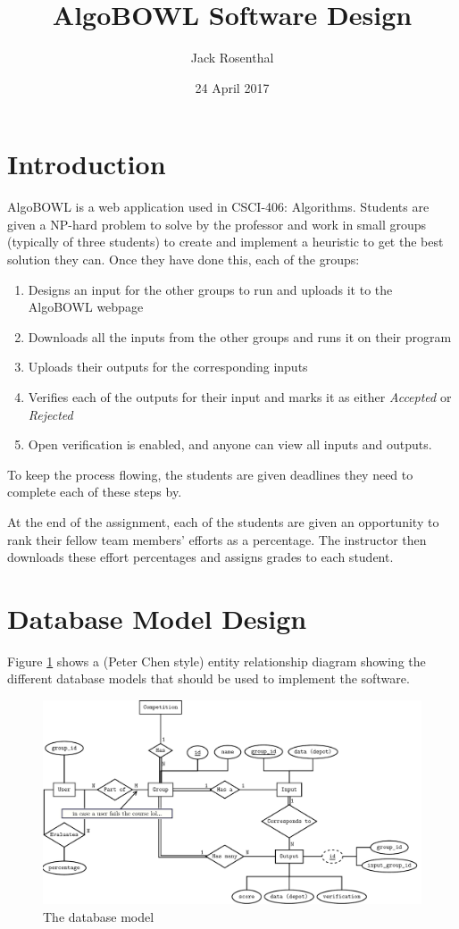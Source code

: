 \documentclass[12pt]{article}
\title{AlgoBOWL Software Design}
\date{24 April 2017}
\author{Jack Rosenthal}
\begin{document}
\maketitle

\section{Introduction}

AlgoBOWL is a web application used in CSCI-406: Algorithms. Students are given
a NP-hard problem to solve by the professor and work in small groups (typically
of three students) to create and implement a heuristic to get the best solution
they can. Once they have done this, each of the groups:
\begin{enumerate}
    \item Designs an input for the other groups to run and uploads it to the
        AlgoBOWL webpage
    \item Downloads all the inputs from the other groups and runs it on their
        program
    \item Uploads their outputs for the corresponding inputs
    \item Verifies each of the outputs for their input and marks it as either
        \emph{Accepted} or \emph{Rejected}
    \item Open verification is enabled, and anyone can view all inputs and
        outputs.
\end{enumerate}

To keep the process flowing, the students are given deadlines they need to
complete each of these steps by.

At the end of the assignment, each of the students are given an opportunity to
rank their fellow team members' efforts as a percentage. The instructor then
downloads these effort percentages and assigns grades to each student.

\section{Database Model Design}

Figure \ref{erd} shows a (Peter Chen style) entity relationship diagram showing
the different database models that should be used to implement the software.

\begin{figure}
    \includegraphics[width=\textwidth]{graphics/algo_erd.pdf}
    \caption{The database model}
    \label{erd}
\end{figure}
\end{document}
